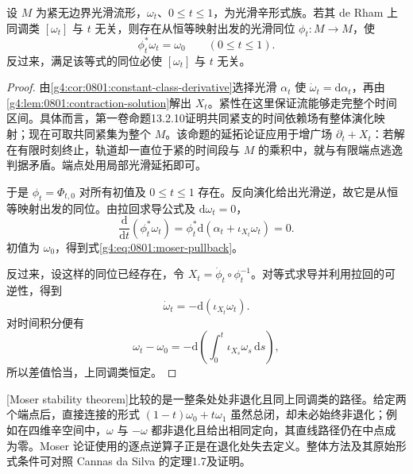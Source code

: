 \begin{theorem}\label{g4:thm:0801:moser}
	设 \(M\) 为紧无边界光滑流形，\(\omega_t\)、\(0\le t\le1\)，为光滑辛形式族。若其 de Rham 上同调类 \([\omega_t]\) 与 \(t\) 无关，则存在从恒等映射出发的光滑同位 \(\phi_t:M\to M\)，使
	\begin{equation}\label{g4:eq:0801:moser-pullback}
		\phi_t^*\omega_t=\omega_0\qquad(0\le t\le1).
	\end{equation}
	反过来，满足该等式的同位必使 \([\omega_t]\) 与 \(t\) 无关。
\end{theorem}
\begin{proof}
	由\cref{g4:cor:0801:constant-class-derivative}选择光滑 \(\alpha_t\) 使 \(\dot\omega_t=\mathrm{d}\alpha_t\)，再由\cref{g4:lem:0801:contraction-solution}解出 \(X_t\)。紧性在这里保证流能够走完整个时间区间。具体而言，第一卷命题13.2.10证明共同紧支的时间依赖场有整体演化映射；现在可取共同紧集为整个 \(M\)。该命题的延拓论证应用于增广场 \(\partial_t+X_t\)：若解在有限时刻终止，轨道却一直位于紧的时间段与 \(M\) 的乘积中，就与有限端点逃逸判据矛盾。端点处用局部光滑延拓即可。

	于是 \(\phi_t=\Phi_{t,0}\) 对所有初值及 \(0\le t\le1\) 存在。反向演化给出光滑逆，故它是从恒等映射出发的同位。由拉回求导公式及 \(\mathrm{d}\omega_t=0\)，
	\[
		\frac{\mathrm{d}}{\mathrm{d}t}(\phi_t^*\omega_t)
		=\phi_t^*\mathrm{d}(\alpha_t+\iota_{X_t}\omega_t)=0.
	\]
	初值为 \(\omega_0\)，得到式\eqref{g4:eq:0801:moser-pullback}。

	反过来，设这样的同位已经存在，令 \(X_t=\dot\phi_t\circ\phi_t^{-1}\)。对等式求导并利用拉回的可逆性，得到
	\[
		\dot\omega_t=-\mathrm{d}(\iota_{X_t}\omega_t).
	\]
	对时间积分便有
	\[
		\omega_t-\omega_0
		=-\mathrm{d}\left(\int_0^t\iota_{X_s}\omega_s\,\mathrm{d}s\right),
	\]
	所以差值恰当，上同调类恒定。
\end{proof}

[Moser stability theorem]比较的是一整条处处非退化且同上同调类的路径。给定两个端点后，直接连接的形式 \((1-t)\omega_0+t\omega_1\) 虽然总闭，却未必始终非退化；例如在四维辛空间中，\(\omega\) 与 \(-\omega\) 都非退化且给出相同定向，其直线路径仍在中点成为零。Moser 论证使用的逐点逆算子正是在退化处失去定义。整体方法及其原始形式条件可对照 Cannas da Silva 的定理1.7及证明。\cite[第1.4节，第88--90页]{Cannas2006Symplectic}

